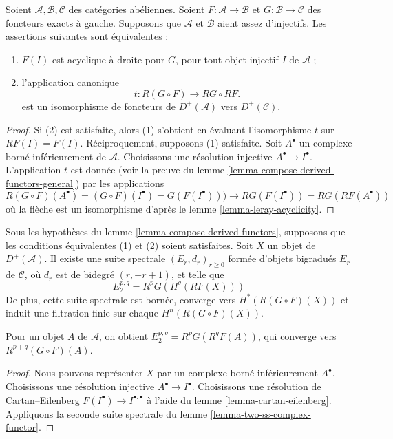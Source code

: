 \begin{lemma}
\label{lemma-compose-derived-functors}
Soient $\mathcal{A}, \mathcal{B}, \mathcal{C}$ des catégories abéliennes.
Soient $F : \mathcal{A} \to \mathcal{B}$ et
$G : \mathcal{B} \to \mathcal{C}$ des foncteurs exacts à gauche. Supposons
que $\mathcal{A}$ et $\mathcal{B}$ aient assez d'injectifs. Les assertions
suivantes sont équivalentes :
\begin{enumerate}
\item $F(I)$ est acyclique à droite pour $G$, pour tout objet injectif $I$
de $\mathcal{A}$ ;
\item l'application canonique
$$
t : R(G \circ F) \longrightarrow RG \circ RF.
$$
est un isomorphisme de foncteurs de $D^{+}(\mathcal{A})$ vers
$D^{+}(\mathcal{C})$.
\end{enumerate}
\end{lemma}

\begin{proof}
Si (2) est satisfaite, alors (1) s'obtient en évaluant l'isomorphisme $t$ sur
$RF(I) = F(I)$. Réciproquement, supposons (1) satisfaite.
Soit $A^\bullet$ un complexe borné inférieurement de $\mathcal{A}$.
Choisissons une résolution injective $A^\bullet \to I^\bullet$.
L'application $t$ est donnée (voir la preuve du
lemme \ref{lemma-compose-derived-functors-general}) par les applications
$$
R(G \circ F)(A^\bullet) =
(G \circ F)(I^\bullet) =
G(F(I^\bullet))) \to
RG(F(I^\bullet)) =
RG(RF(A^\bullet))
$$
où la flèche est un isomorphisme d'après le
lemme \ref{lemma-leray-acyclicity}.
\end{proof}

\begin{lemma}
\label{lemma-grothendieck-spectral-sequence}
Sous les hypothèses du lemme \ref{lemma-compose-derived-functors}, supposons
que les conditions équivalentes (1) et (2) soient satisfaites.
Soit $X$ un objet de $D^{+}(\mathcal{A})$.
Il existe une suite spectrale $(E_r, d_r)_{r \geq 0}$ formée d'objets
bigradués $E_r$ de $\mathcal{C}$, où $d_r$ est de bidegré $(r, - r + 1)$,
et telle que
$$
E_2^{p, q} = R^pG(H^q(RF(X)))
$$
De plus, cette suite spectrale est bornée, converge vers
$H^*(R(G \circ F)(X))$ et induit une filtration finie sur chaque
$H^n(R(G \circ F)(X))$.
\end{lemma}

\noindent
Pour un objet $A$ de $\mathcal{A}$, on obtient
$E_2^{p, q} = R^pG(R^qF(A))$, qui converge vers
$R^{p + q}(G \circ F)(A)$.

\begin{proof}
Nous pouvons représenter $X$ par un complexe borné inférieurement
$A^\bullet$. Choisissons une résolution injective
$A^\bullet \to I^\bullet$. Choisissons une résolution de Cartan--Eilenberg
$F(I^\bullet) \to I^{\bullet, \bullet}$ à l'aide du
lemme \ref{lemma-cartan-eilenberg}. Appliquons la seconde suite spectrale du
lemme \ref{lemma-two-ss-complex-functor}.
\end{proof}


